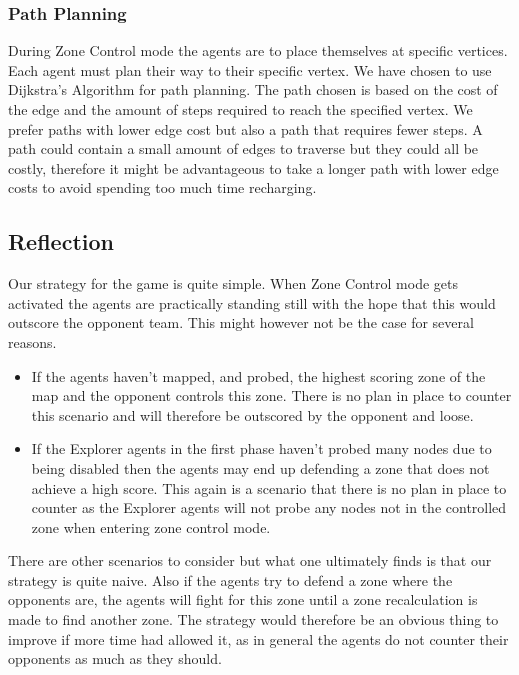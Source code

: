 \documentclass[11pt]{article}
\begin{document}
\subsubsection{Path Planning}
During Zone Control mode the agents are to place themselves at specific vertices. Each agent must plan their way to their specific vertex. We have chosen to use Dijkstra's Algorithm for path planning. The path chosen is based on the cost of the edge and the amount of steps required to reach the specified vertex. We prefer paths with lower edge cost but also a path that requires fewer steps. A path could contain a small amount of edges to traverse but they could all be costly, therefore it might be advantageous to take a longer path with lower edge costs to avoid spending too much time recharging. 

\subsection{Reflection}
Our strategy for the game is quite simple. When Zone Control mode gets activated the agents are practically standing still with the hope that this would outscore the opponent team. This might however not be the case for several reasons.

\begin{itemize}
	\item If the agents haven't mapped, and probed, the highest scoring zone of the map and the opponent controls this zone. There is no plan in place to counter this scenario and will therefore be outscored by the opponent and loose.
	
	\item If the Explorer agents in the first phase haven't probed many nodes due to being disabled then the agents may end up defending a zone that does not achieve a high score. This again is a scenario that there is no plan in place to counter as the Explorer agents will not probe any nodes not in the controlled zone when entering zone control mode.
\end{itemize}

There are other scenarios to consider but what one ultimately finds is that our strategy is quite naive. Also if the agents try to defend a zone where the opponents are, the agents will fight for this zone until a zone recalculation is made to find another zone. The strategy would therefore be an obvious thing to improve if more time had allowed it, as in general the agents do not counter their opponents as much as they should.
\end{document}
